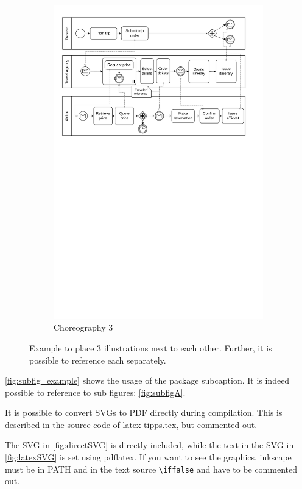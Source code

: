 \begin{figure}
\begin{subfigure}{.3\textwidth}
    \includegraphics[width=.9\textwidth]{figures/choreography.pdf}
    \caption{Choreography 3}
    \label{fig:subfigC}
  \end{subfigure}
  \caption{Example to place 3 illustrations next to each other. Further, it is possible to reference each separately.}
  \label{fig:subfig_example}
\end{figure}

\autoref{fig:subfig_example} shows the usage of the package subcaption.
It is indeed possible to reference to sub figures: \autoref{fig:subfigA}.

It is possible to convert SVGs to PDF directly during compilation.
This is described in the source code of latex-tipps.tex, but commented out.

\iffalse %
  The SVG in \autoref{fig:directSVG} is directly included, while the text in the SVG in \autoref{fig:latexSVG} is set using pdflatex.
  If you want to see the graphics, inkscape must be in PATH and in the text source \texttt{\textbackslash{}iffalse} and  have to be commented out.

